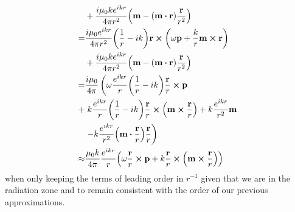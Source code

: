 \documentclass{article}
\begin{document}
\begin{enumerate}[(i)]
\begin{align}
\begin{split}
&+\frac{i\mu_0ke^{ikr}}{4\pi r^2}\qty(\vb{m}-(\vb{m}\vdot\vb{r})\frac{\vb{r}}{r^2})\\
=&\frac{i\mu_0e^{ikr}}{4\pi r^2}\qty(\frac{1}{r}-ik)\vb{r}\cross\qty(\omega\vb{p}+\frac{k}{r}\vb{m}\cross\vb{r})\\
&+\frac{i\mu_0ke^{ikr}}{4\pi r^2}\qty(\vb{m}-(\vb{m}\vdot\vb{r})\frac{\vb{r}}{r^2})\\
=&\frac{i\mu_0}{4\pi}\left(\omega\frac{e^{ikr}}{r}\qty(\frac{1}{r}-ik)\frac{\vb{r}}{r}\cross\vb{p}\right.\\
+&\left.k\frac{e^{ikr}}{r}\qty(\frac{1}{r}-ik)\frac{\vb{r}}{r}\cross\qty(\vb{m}\cross\frac{\vb{r}}{r})+k\frac{e^{ikr}}{r^2}\vb{m}\right.\\
&\left.-k\frac{e^{ikr}}{r^2}\qty(\vb{m}\vdot\frac{\vb{r}}{r})\frac{\vb{r}}{r}\right)\\
\approx&\frac{\mu_0k}{4\pi}\frac{e^{ikr}}{r}\qty(\omega\frac{\vb{r}}{r}\cross\vb{p}+k\frac{\vb{r}}{r}\cross\qty(\vb{m}\cross\frac{\vb{r}}{r}))
\end{split}
\end{align}
when only keeping the terms of leading order in $r^{-1}$ given that we are in the radiation zone and to remain consistent with the order of our previous approximations.


\end{enumerate}
\end{document}
